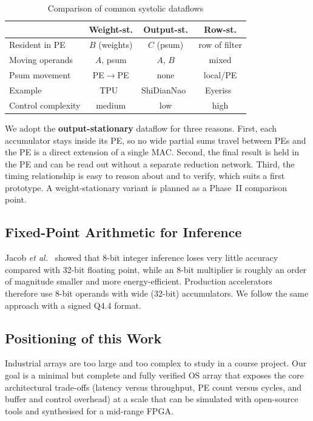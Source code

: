 \documentclass[conference]{IEEEtran}
\begin{document}
\begin{table}[t]
\centering
\caption{Comparison of common systolic dataflows}
\label{tab:dataflow}
\setlength{\tabcolsep}{3pt}
\begin{tabular}{@{}lccc@{}}
\toprule
 & \textbf{Weight-st.} & \textbf{Output-st.} & \textbf{Row-st.}\\
\midrule
Resident in PE & $B$ (weights) & $C$ (psum) & row of filter \\
Moving operands & $A$, psum & $A$, $B$ & mixed \\
Psum movement & PE$\rightarrow$PE & none & local/PE \\
Example & TPU~\cite{jouppi2017tpu} & ShiDianNao~\cite{du2015shidiannao} & Eyeriss~\cite{chen2017eyeriss}\\
Control complexity & medium & low & high \\
\bottomrule
\end{tabular}
\end{table}

We adopt the \textbf{output-stationary} dataflow for three reasons. First,
each accumulator stays inside its PE, so no wide partial sums travel
between PEs and the PE is a direct extension of a single MAC. Second, the
final result is held in the PE and can be read out without a separate
reduction network. Third, the timing relationship is easy to reason about
and to verify, which suits a first prototype. A weight-stationary variant
is planned as a Phase~II comparison point.

\subsection{Fixed-Point Arithmetic for Inference}
Jacob \emph{et al.}~\cite{jacob2018quantization} showed that 8-bit
integer inference loses very little accuracy compared with 32-bit floating point,
while an 8-bit multiplier is roughly an order of magnitude smaller and more
energy-efficient. Production accelerators~\cite{jouppi2017tpu} therefore
use 8-bit operands with wide (32-bit) accumulators. We follow the same
approach with a signed Q4.4 format.

\subsection{Positioning of this Work}
Industrial arrays are too large and too complex to study in a course project.
Our goal is a minimal but complete and fully verified OS array that
exposes the core architectural trade-offs (latency versus throughput, PE
count versus cycles, and buffer and control overhead) at a scale that can be
simulated with open-source tools and synthesised for a mid-range FPGA.
\end{document}
